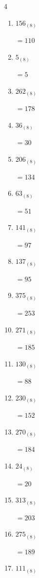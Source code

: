 \begin{multicols}{4}
\begin{enumerate}
  \item $156_{(8)}$

        $=110$

  \item $5_{(8)}$

        $=5$

  \item $262_{(8)}$

        $=178$

  \item $36_{(8)}$

        $=30$

\columnbreak %

  \item $206_{(8)}$

        $=134$

  \item $63_{(8)}$

        $=51$

  \item $141_{(8)}$

        $=97$

  \item $137_{(8)}$

        $=95$

  \item $375_{(8)}$

        $=253$

  \item $271_{(8)}$

        $=185$

  \item $130_{(8)}$

        $=88$

  \item $230_{(8)}$

        $=152$

  \item $270_{(8)}$

        $=184$

  \item $24_{(8)}$

        $=20$

  \item $313_{(8)}$

        $=203$

  \item $275_{(8)}$

        $=189$

  \item $111_{(8)}$


\end{enumerate}
\end{multicols}
